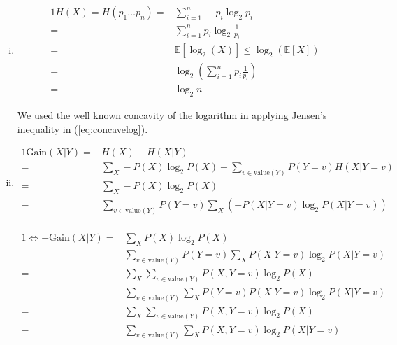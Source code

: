 \documentclass[10pt,a4paper,boxed]{hmcpset}
\begin{document}
\begin{problem}
\end{problem}
\begin{solution}
	\begin{enumerate}[(i)]	
		\item \label{task1}
		\begin{alignat}{1}
			H(X) = H\left(p_{1}\ldots p_{n}\right) = & \sum_{i=1}^{n}-p_{i}\log_{2}p_{i} \nonumber \\ 
				 = & \sum_{i=1}^{n}p_{i}\log_{2}\frac{1}{p_{i}} \nonumber \\
				 = & \mathbb{E}\left[\log_{2}\left(X\right)\right]\leq\log_{2}\left(\mathbb{E}\left[X\right]\right) \label{eq:concavelog} \\
				 = & \log_{2}\left(\sum_{i=1}^{n}p_{i}\frac{1}{p_{i}}\right) \nonumber \\
				 = & \log_{2}n \nonumber
		\end{alignat}
		
		We used the well known concavity of the logarithm in applying Jensen's inequality in (\ref{eq:concavelog}).
		
		\item
		\begin{alignat*}{1}
			\mathrm{Gain}\left(X\vert Y\right)     = & H\left(X\right)-H\left(X|Y\right)\\
												   = &\sum_{X}-P\left(X\right)\log_{2}P\left(X\right)-\sum_{v\in\mathrm{value}(Y)}P\left(Y=v\right)H\left(X\vert Y=v\right)\\
											       = & \sum_{X}-P\left(X\right)\log_{2}P\left(X\right)\\
											       - & \sum_{v\in\mathrm{value}(Y)}P\left(Y=v\right)\sum_{X}\left(-P\left(X\vert Y=v\right)\log_{2}P\left(X\vert Y=v\right)\right)\\
		\end{alignat*}
		
		\begin{alignat*}{1}
			\Leftrightarrow\mathrm{-Gain}\left(X\vert Y\right) = & \sum_{X}P\left(X\right)\log_{2}P\left(X\right)\\
															   - & \sum_{v\in\mathrm{value}(Y)}P\left(Y=v\right)\sum_{X}P\left(X\vert Y=v\right)\log_{2}P\left(X\vert Y=v\right)\\
 												   = & \sum_{X}\sum_{v\in\mathrm{value}(Y)}P\left(X,Y=v\right)\log_{2}P\left(X\right)\\
 												   - & \sum_{v\in\mathrm{value}(Y)}\sum_{X}P\left(Y=v\right)P\left(X\vert Y=v\right)\log_{2}P\left(X\vert Y=v\right)\\
												   = & \sum_{X}\sum_{v\in\mathrm{value}(Y)}P\left(X,Y=v\right)\log_{2}P\left(X\right)\\
												   - & \sum_{v\in\mathrm{value}(Y)}\sum_{X}P\left(X,Y=v\right)\log_{2}P\left(X\vert Y=v\right)\\
		\end{alignat*}
		

\end{enumerate}
\end{solution}
\end{document}
